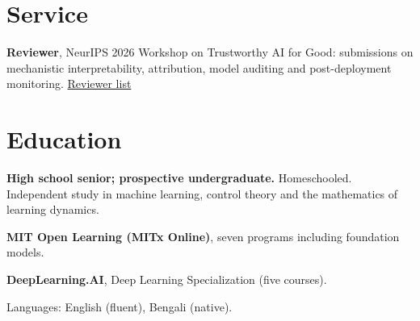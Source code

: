 \documentclass[10pt,a4paper]{article}
\newcommand{\cvitem}[3]{%
  \begin{list}{}{%
    \setlength{\leftmargin}{2.35cm}%
    \setlength{\labelwidth}{2.1cm}%
    \setlength{\labelsep}{0.25cm}%
    \setlength{\itemindent}{0pt}%
    \setlength{\listparindent}{0pt}%
    \setlength{\rightmargin}{0pt}%
    \setlength{\topsep}{0pt}%
    \setlength{\partopsep}{0pt}%
    \setlength{\parsep}{0pt}%
    \setlength{\itemsep}{0pt}%
  }%
  \item[{\makebox[2.1cm][l]{\footnotesize\color{muted}#1}}]%
  #2
  #3
  \end{list}%
  \vspace{1.5pt}
}
\begin{document}
\section*{Service}
\cvitem{2026}{\textbf{Reviewer}, NeurIPS 2026 Workshop on Trustworthy AI for Good: submissions on mechanistic interpretability, attribution, model auditing and post-deployment monitoring. \href{https://trustworthy-ai-for-good.github.io/\#reviewers}{Reviewer list}}{}

\section*{Education}
\cvitem{present}{\textbf{High school senior; prospective undergraduate.} Homeschooled. Independent study in machine learning, control theory and the mathematics of learning dynamics.}{}
\cvitem{2025--2026}{\textbf{MIT Open Learning (MITx Online)}, seven programs including foundation models.}{}
\cvitem{2025--2026}{\textbf{DeepLearning.AI}, Deep Learning Specialization (five courses).}{}
\cvitem{}{Languages: English (fluent), Bengali (native).}{}
\end{document}
